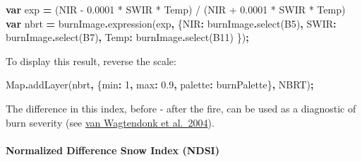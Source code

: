 \documentclass[
]{article}
\newenvironment{Shaded}{\begin{snugshade}}{\end{snugshade}}
\newcommand{\BuiltInTok}[1]{#1}
\newcommand{\DataTypeTok}[1]{\textcolor[rgb]{0.13,0.29,0.53}{#1}}
\newcommand{\DecValTok}[1]{\textcolor[rgb]{0.00,0.00,0.81}{#1}}
\newcommand{\FloatTok}[1]{\textcolor[rgb]{0.00,0.00,0.81}{#1}}
\newcommand{\FunctionTok}[1]{\textcolor[rgb]{0.00,0.00,0.00}{#1}}
\newcommand{\KeywordTok}[1]{\textcolor[rgb]{0.13,0.29,0.53}{\textbf{#1}}}
\newcommand{\NormalTok}[1]{#1}
\newcommand{\OperatorTok}[1]{\textcolor[rgb]{0.81,0.36,0.00}{\textbf{#1}}}
\newcommand{\StringTok}[1]{\textcolor[rgb]{0.31,0.60,0.02}{#1}}
\begin{document}
\begin{Shaded}
\begin{Highlighting}[]
\KeywordTok{var}\NormalTok{ exp }\OperatorTok{=} \StringTok{\textquotesingle{}(NIR {-} 0.0001 * SWIR *  Temp) / (NIR + 0.0001 * SWIR * Temp)\textquotesingle{}}
\KeywordTok{var}\NormalTok{ nbrt }\OperatorTok{=}\NormalTok{ burnImage}\OperatorTok{.}\FunctionTok{expression}\NormalTok{(exp}\OperatorTok{,}   
\NormalTok{                                \{}\StringTok{\textquotesingle{}NIR\textquotesingle{}}\OperatorTok{:}\NormalTok{ burnImage}\OperatorTok{.}\FunctionTok{select}\NormalTok{(}\StringTok{\textquotesingle{}B5\textquotesingle{}}\NormalTok{)}\OperatorTok{,}   
                                 \StringTok{\textquotesingle{}SWIR\textquotesingle{}}\OperatorTok{:}\NormalTok{ burnImage}\OperatorTok{.}\FunctionTok{select}\NormalTok{(}\StringTok{\textquotesingle{}B7\textquotesingle{}}\NormalTok{)}\OperatorTok{,}   
                                 \StringTok{\textquotesingle{}Temp\textquotesingle{}}\OperatorTok{:}\NormalTok{ burnImage}\OperatorTok{.}\FunctionTok{select}\NormalTok{(}\StringTok{\textquotesingle{}B11\textquotesingle{}}\NormalTok{)  }
\NormalTok{                                \})}\OperatorTok{;}  
\end{Highlighting}
\end{Shaded}

To display this result, reverse the scale:

\begin{Shaded}
\begin{Highlighting}[]
  \BuiltInTok{Map}\OperatorTok{.}\FunctionTok{addLayer}\NormalTok{(nbrt}\OperatorTok{,}\NormalTok{ \{}\DataTypeTok{min}\OperatorTok{:} \DecValTok{1}\OperatorTok{,} \DataTypeTok{max}\OperatorTok{:} \FloatTok{0.9}\OperatorTok{,}  \DataTypeTok{palette}\OperatorTok{:}\NormalTok{ burnPalette\}}\OperatorTok{,} \StringTok{\textquotesingle{}NBRT\textquotesingle{}}\NormalTok{)}\OperatorTok{;}  
\end{Highlighting}
\end{Shaded}

The difference in this index, before - after the fire, can be used as a diagnostic of burn severity (see \href{http://www.sciencedirect.com/science/article/pii/S003442570400152X}{van Wagtendonk et al.~2004}).

\hypertarget{normalized-difference-snow-index-ndsi}{%
\paragraph{Normalized Difference Snow Index (NDSI)}\label{normalized-difference-snow-index-ndsi}}
\end{document}
